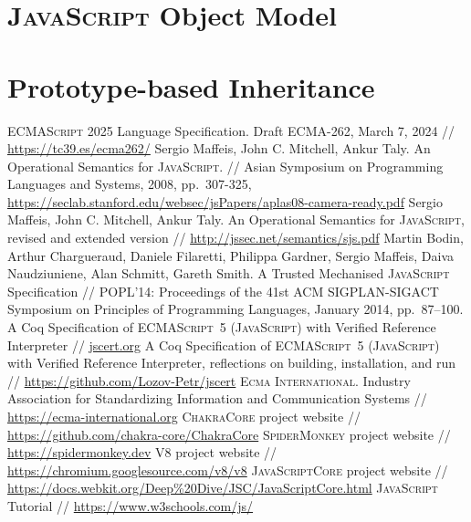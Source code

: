 \documentclass{article}
\newcommand{\js}{\textsc{JavaScript}\xspace}
\newcommand{\es}{\textsc{ECMAScript}\xspace}
\newcommand{\ecma}{\textsc{Ecma International}\xspace}
\begin{document}
\section{\js Object Model}

\section{Prototype-based Inheritance}


\begin{thebibliography}{99}
  \es\textsuperscript{\textregistered} 2025 Language Specification. Draft ECMA-262, March 7, 2024 //
  \url{https://tc39.es/ecma262/}
  Sergio Maffeis, John C. Mitchell, Ankur Taly. An Operational Semantics for \js. // Asian Symposium on Programming Languages and Systems, 2008, pp.~307-325,
  \url{https://seclab.stanford.edu/websec/jsPapers/aplas08-camera-ready.pdf}
  Sergio Maffeis, John C. Mitchell, Ankur Taly. An Operational Semantics for \js, revised and extended version // \url{http://jssec.net/semantics/sjs.pdf}
  Martin Bodin, Arthur Chargueraud, Daniele Filaretti, Philippa Gardner, Sergio Maffeis, Daiva Naudziuniene, Alan Schmitt, Gareth Smith. A Trusted Mechanised \js Specification //
  POPL'14: Proceedings of the 41st ACM SIGPLAN-SIGACT Symposium on Principles of Programming Languages, January 2014, pp.~87–100.
  A Coq Specification of \es~5 (\js) with Verified Reference Interpreter // \url{jscert.org}
  A Coq Specification of \es~5 (\js) with Verified Reference Interpreter, reflections on building, installation, and run // \url{https://github.com/Lozov-Petr/jscert}  
 \ecma. Industry Association for Standardizing Information and Communication Systems // \url{https://ecma-international.org}
 \textsc{ChakraCore} project website // \url{https://github.com/chakra-core/ChakraCore}
 \textsc{SpiderMonkey} project website // \url{https://spidermonkey.dev}
 \textsc{V8} project website // \url{https://chromium.googlesource.com/v8/v8}
 \textsc{JavaScriptCore} project website // \url{https://docs.webkit.org/Deep%20Dive/JSC/JavaScriptCore.html}
 \js Tutorial // \url{https://www.w3schools.com/js/}
\end{thebibliography}
\end{document}
